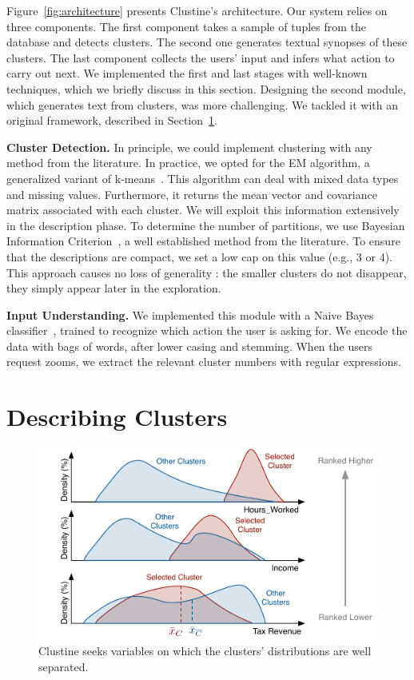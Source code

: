 Figure~\ref{fig:architecture} presents Clustine's architecture.  Our system
relies on three components. The first component takes a sample of tuples from
the database and detects clusters. The second one generates textual synopses of
these clusters. The last component collects the users' input and infers what
action to carry out next. We implemented the first and last stages with
well-known techniques, which we briefly discuss in this section. Designing the
second module, which generates text from clusters, was more challenging. We
tackled it with an original framework, described in Section~\ref{sec:describingClu}.

\textbf{Cluster Detection.} In principle, we could implement clustering with
any method from the literature. In practice, we opted for the EM algorithm, a
generalized variant of k-means~\cite{bishop2001bishop}. This algorithm can deal
with mixed data types and missing values. Furthermore, it returns the mean
vector and covariance matrix associated with each cluster. We will exploit this
information extensively in the description phase. To determine the number of
partitions, we use Bayesian Information Criterion~\cite{bishop2001bishop}, a
well established method from the literature. To ensure that the descriptions
are compact, we set a low cap on this value (e.g., 3 or 4). This approach
causes no loss of generality : the smaller clusters do not disappear, they
simply appear later in the exploration.

\textbf{Input Understanding.}  We implemented this module with a Naive Bayes
classifier~\cite{bishop2001bishop}, trained to recognize which action the user
is asking for. We encode the data with bags of words, after lower casing and
stemming.  When the users request zooms, we extract the relevant cluster
numbers with regular expressions.

\section{Describing Clusters}
\label{sec:describingClu}

\begin{figure}[t!]
  \centering
  \includegraphics[width=\columnwidth]{Ranking}
  \caption{Clustine seeks variables on which the clusters' distributions are
  well separated.}
  \label{fig:Ranking}
\end{figure}

